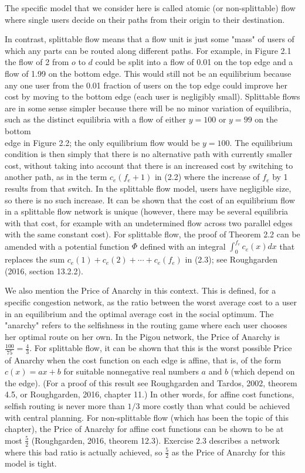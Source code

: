 \documentclass[12pt]{article}
\begin{document}
The specific model that we consider here is called atomic (or non-splittable) flow where single users decide on their paths from their origin to their destination.

In contrast, splittable flow means that a flow unit is just some "mass" of users of which any parts can be routed along different paths. For example, in Figure 2.1 the flow of 2 from $o$ to $d$ could be split into a flow of 0.01 on the top edge and a flow of 1.99 on the bottom edge. This would still not be an equilibrium because any one user from the 0.01 fraction of users on the top edge could improve her cost by moving to the bottom edge (each user is negligibly small). Splittable flows are in some sense simpler because there will be no minor variation of equilibria, such as the distinct equilibria with a flow of either $y=100$ or $y=99$ on the bottom\\
edge in Figure 2.2; the only equilibrium flow would be $y=100$. The equilibrium condition is then simply that there is no alternative path with currently smaller cost, without taking into account that there is an increased cost by switching to another path, as in the term $c_{e}\left(f_{e}+1\right)$ in (2.2) where the increase of $f_{e}$ by 1 results from that switch. In the splittable flow model, users have negligible size, so there is no such increase. It can be shown that the cost of an equilibrium flow in a splittable flow network is unique (however, there may be several equilibria with that cost, for example with an undetermined flow across two parallel edges with the same constant cost). For splittable flow, the proof of Theorem 2.2 can be amended with a potential function $\Phi$ defined with an integral $\int_{0}^{f_{e}} c_{e}(x) d x$ that replaces the sum $c_{e}(1)+c_{e}(2)+\cdots+c_{e}\left(f_{e}\right)$ in (2.3); see Roughgarden (2016, section 13.2.2).

We also mention the Price of Anarchy in this context. This is defined, for a specific congestion network, as the ratio between the worst average cost to a user in an equilibrium and the optimal average cost in the social optimum. The "anarchy" refers to the selfishness in the routing game where each user chooses her optimal route on her own. In the Pigou network, the Price of Anarchy is $\frac{100}{75}=\frac{4}{3}$. For splittable flow, it can be shown that this is the worst possible Price of Anarchy when the cost function on each edge is affine, that is, of the form $c(x)=a x+b$ for suitable nonnegative real numbers $a$ and $b$ (which depend on the edge). (For a proof of this result see Roughgarden and Tardos, 2002, theorem 4.5, or Roughgarden, 2016, chapter 11.) In other words, for affine cost functions, selfish routing is never more than $1 / 3$ more costly than what could be achieved with central planning. For non-splittable flow (which has been the topic of this chapter), the Price of Anarchy for affine cost functions can be shown to be at most $\frac{5}{2}$ (Roughgarden, 2016, theorem 12.3). Exercise 2.3 describes a network where this bad ratio is actually achieved, so $\frac{5}{2}$ as the Price of Anarchy for this model is tight.
\end{document}
